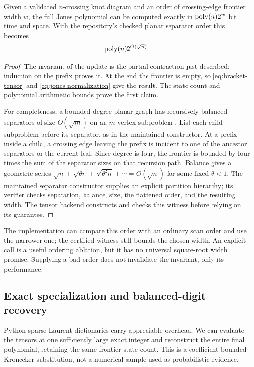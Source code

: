 \begin{theorem}
Given a validated $n$-crossing knot diagram and an order of crossing-edge
frontier width $w$, the full Jones polynomial can be computed exactly in
$\operatorname{poly}(n)2^w$ bit time and space. With the repository's checked planar
separator order this becomes
\[
 \operatorname{poly}(n)2^{O(\sqrt n)}.
\]
\label{thm:tensor}
\end{theorem}
\begin{proof}
The invariant of the update is the partial contraction just described;
induction on the prefix proves it. At the end the frontier is empty, so
\eqref{eq:bracket-tensor} and \eqref{eq:jones-normalization} give the result.
The state count and polynomial arithmetic bounds prove the first claim.

For completeness, a bounded-degree planar graph has recursively balanced
separators of size $O(\sqrt m)$ on an $m$-vertex subproblem
\cite{lipton1979}. List each child subproblem before its separator, as in
the maintained constructor. At a
prefix inside a child, a crossing edge leaving the prefix is incident to
one of the ancestor separators or the current leaf. Since degree is four,
the frontier is bounded by four times the sum of the separator sizes on
that recursion path. Balance gives a geometric series
$\sqrt n+\sqrt{\theta n}+\sqrt{\theta^2n}+\cdots=O(\sqrt n)$ for
some fixed $\theta<1$. The maintained separator constructor supplies an
explicit partition hierarchy; its verifier checks separation, balance,
size, the flattened order, and the resulting width. The tensor backend
constructs and checks this witness before relying on its guarantee.
\end{proof}

The implementation can compare this order with an ordinary scan order and
use the narrower one; the certified witness still bounds the chosen width.
An explicit  call is a useful ordering ablation, but
it has no universal square-root width promise. Supplying a bad order does
not invalidate the invariant, only its performance.

\subsection{Exact specialization and balanced-digit recovery}

Python sparse Laurent dictionaries carry appreciable overhead. We can
evaluate the tensors at one sufficiently large exact integer and reconstruct
the entire final polynomial, retaining the same frontier state count. This
is a coefficient-bounded Kronecker substitution, not a numerical sample used
as probabilistic evidence.

